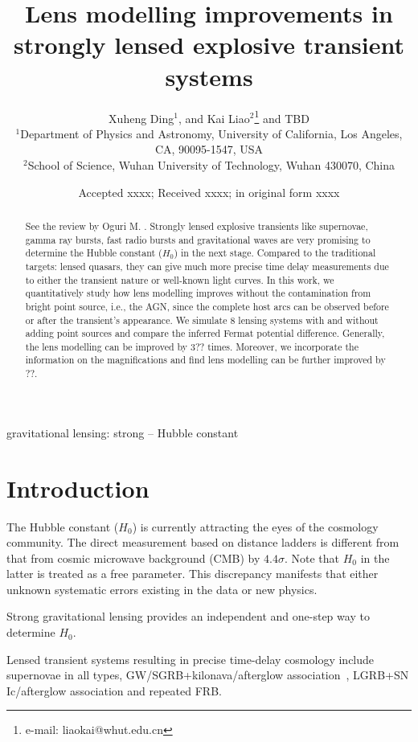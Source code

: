 \documentclass[useAMS,usenatbib,usegraphicx]{mn2e}
\title[Lens modelling improvements in lensed transients]{Lens modelling improvements in strongly lensed explosive transient systems}
\author[Ding et al.]
{Xuheng Ding$^{1}$,
and Kai Liao$^{2}$\thanks{e-mail: liaokai@whut.edu.cn}
and TBD\\
$^{1}$Department of Physics and Astronomy, University of California, Los Angeles, CA, 90095-1547, USA\\
$^{2}$School of Science, Wuhan University of Technology, Wuhan 430070, China}
\begin{document}
\date{Accepted xxxx; Received xxxx; in original form xxxx}

\pagerange{\pageref{firstpage}--\pageref{lastpage}} 

\maketitle

\label{firstpage}

\begin{abstract}
  See the review by Oguri M. \citep{Oguri2019}. Strongly lensed explosive transients like supernovae, gamma ray bursts, fast radio bursts and gravitational waves are very promising to determine the Hubble constant ($H_0$) in the next stage. Compared to the traditional targets: lensed quasars, they can give much more precise time delay measurements due to either the transient nature or well-known light curves. In this work, we quantitatively study how lens modelling improves without the contamination from bright point source, i.e., the AGN, since the complete host arcs can be observed before or after the transient's appearance. We simulate 8 lensing systems with and without adding point sources and compare the inferred Fermat potential difference.
  Generally, the lens modelling can be improved by 3?? times. Moreover, we incorporate
  the information on the magnifications and find lens modelling can be further improved by ??.
\end{abstract}

\begin{keywords}
gravitational lensing: strong \--- Hubble constant
\end{keywords}


\section{Introduction}

The Hubble constant ($H_0$) is currently attracting the eyes of the cosmology community. The direct measurement based on distance ladders is different from that from cosmic microwave background (CMB) by $4.4\sigma$. Note that $H_0$ in the latter is treated as a free parameter. This discrepancy manifests that
either unknown systematic errors existing in the data or new physics.

Strong gravitational lensing provides an independent and one-step way to determine $H_0$.

Lensed transient systems resulting in precise time-delay cosmology
include supernovae in all types,
GW/SGRB+kilonava/afterglow association~\citep{Liao2017}, LGRB+SN Ic/afterglow association and repeated FRB.
\end{document}
